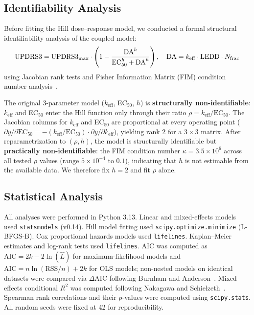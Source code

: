 \subsection{Identifiability Analysis}

Before fitting the Hill dose--response model, we conducted a formal
structural identifiability analysis of the coupled model:
\begin{equation}
  \text{UPDRS3} = \text{UPDRS3}_\text{max} \cdot \left(1 -
  \frac{\mathrm{DA}^h}{\text{EC}_{50}^h + \mathrm{DA}^h}\right),
  \quad \mathrm{DA} = k_\text{eff} \cdot \mathrm{LEDD} \cdot N_{\mathrm{frac}}
  \label{eq:hill}
\end{equation}
using Jacobian rank tests and Fisher Information Matrix (FIM) condition
number analysis~\cite{raue2009,villaverde2016}.

The original 3-parameter model ($k_\text{eff}$, EC$_{50}$, $h$) is
\textbf{structurally non-identifiable}: $k_\text{eff}$ and EC$_{50}$
enter the Hill function only through their ratio
$\rho = k_\text{eff}/\text{EC}_{50}$. The Jacobian columns for
$k_\text{eff}$ and EC$_{50}$ are proportional at every operating point
($\partial y/\partial \text{EC}_{50} = -(k_\text{eff}/\text{EC}_{50})
\cdot \partial y/\partial k_\text{eff}$), yielding rank 2 for a
$3 \times 3$ matrix. After reparametrization to $(\rho, h)$, the model
is structurally identifiable but \textbf{practically non-identifiable}:
the FIM condition number $\kappa{=}3.5 \times 10^6$ across all tested
$\rho$ values (range $5 \times 10^{-4}$ to $0.1$), indicating that $h$
is not estimable from the available data. We therefore fix $h{=}2$ and
fit $\rho$ alone.


\subsection{Statistical Analysis}

All analyses were performed in Python 3.13. Linear and mixed-effects
models used \texttt{statsmodels} (v0.14). Hill model fitting used
\texttt{scipy.optimize.minimize} (L-BFGS-B). Cox proportional hazards
models used \texttt{lifelines}. Kaplan--Meier estimates and log-rank
tests used \texttt{lifelines}. AIC was computed as
$\text{AIC} = 2k - 2\ln(\hat{L})$ for maximum-likelihood models and
$\text{AIC} = n \ln(\text{RSS}/n) + 2k$ for OLS models; non-nested
models on identical datasets were compared via $\Delta\text{AIC}$
following Burnham and Anderson~\cite{burnham2002}. Mixed-effects
conditional $R^2$ was computed following Nakagawa and
Schielzeth~\cite{nakagawa2013}. Spearman rank correlations and their
$p$-values were computed using \texttt{scipy.stats}. All random seeds
were fixed at 42 for reproducibility.


